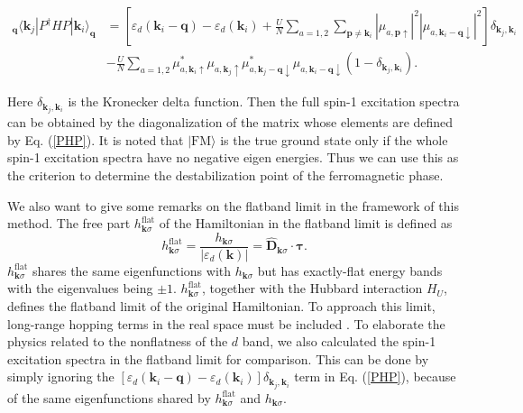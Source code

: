 \documentclass[amsmath,superscriptaddress,showpacs,aps,prb,twocolumn]{revtex4-1}
\begin{document}
\begin{widetext}
\begin{equation}\label{PHP}
\begin{aligned}
_\mathbf{q}\langle\mathbf{k}_j|P^\dagger HP|\mathbf{k}_i\rangle_\mathbf{q}&=\left[\varepsilon_d(\mathbf{k}_i-\mathbf{q})-\varepsilon_d(\mathbf{k}_i)
+\frac{U}{N}\sum_{a=1,2}\sum_{\mathbf{p}\neq\mathbf{k}_i}\left|\mu_{a,\mathbf{p}\uparrow}\right|^2\left|\mu_{a,\mathbf{k}_{i}-\mathbf{q}\downarrow}\right|^2
\right]\delta_{\mathbf{k}_j,\mathbf{k}_i} \\
& -\frac{U}{N}\sum_{a=1,2}
\mu^{\ast}_{a,\mathbf{k}_{i}\uparrow}\mu_{a,\mathbf{k}_{j}\uparrow}\mu^{\ast}_{a,\mathbf{k}_j-\mathbf{q}\downarrow}\mu_{a,\mathbf{k}_i-\mathbf{q}\downarrow}
\left(1-\delta_{\mathbf{k}_j,\mathbf{k}_i}\right).
\end{aligned}
\end{equation}
\end{widetext}
Here $\delta_{\mathbf{k}_j,\mathbf{k}_i}$ is the Kronecker delta function. Then the full spin-1 excitation spectra can be obtained by the diagonalization of the matrix whose elements are defined by Eq. (\ref{PHP}). It is noted that $|\text{FM}\rangle$ is the true ground state only if the whole spin-1 excitation spectra have no negative eigen energies. Thus we can use this as the criterion to determine the destabilization point of the ferromagnetic phase.
\par We also want to give some remarks on the flatband limit in the framework of this method. The free part $h^\text{flat}_{\mathbf{k}\sigma}$ of the Hamiltonian in the flatband limit is defined as
\begin{equation}
h^{\text{flat}}_{\mathbf{k}\sigma}=\frac{h_{\mathbf{k}\sigma}}{\left|\varepsilon_{d}(\mathbf{k})\right|}={\hat{\mathbf{D}}_{\mathbf{k}\sigma}}\cdot\mathbf{\tau}.
\end{equation}
$h^\text{flat}_{\mathbf{k}\sigma}$ shares the same eigenfunctions with $h_{\mathbf{k}\sigma}$ but has exactly-flat energy bands with the eigenvalues being $\pm 1$. $h^\text{flat}_{\mathbf{k}\sigma}$, together with the Hubbard interaction $H_U$, defines the flatband limit of the original Hamiltonian. To approach this limit, long-range hopping terms in the real space must be included \cite{NSCM_PRL2011}. To elaborate the physics related to the nonflatness of the $d$ band, we also calculated the spin-1 excitation spectra in the flatband limit for comparison. This can be done by simply ignoring the $\left[\varepsilon_d(\mathbf{k}_i-\mathbf{q})-\varepsilon_d(\mathbf{k}_i)\right]\delta_{\mathbf{k}_j,\mathbf{k}_i}$ term in Eq. (\ref{PHP}), because of the same eigenfunctions shared by $h^\text{flat}_{\mathbf{k}\sigma}$ and $h_{\mathbf{k}\sigma}$.
\end{document}
